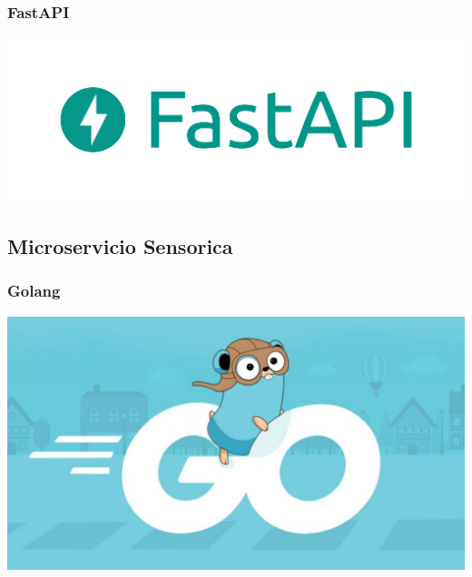 \documentclass{beamer}
\begin{document}
\begin{frame}
    \frametitle{FastAPI}
    \begin{table}
        \includegraphics[width=0.9\linewidth]{../images/diapositivas/fastApi.png}
    \end{table}
\end{frame}


\subsection{Microservicio Sensorica}

\begin{frame}
    \frametitle{Golang}
    \begin{table}
    \includegraphics[width=0.9\linewidth]{../images/diapositivas/golangCuchi.jpeg}
    \end{table}
\end{frame}
\end{document}
